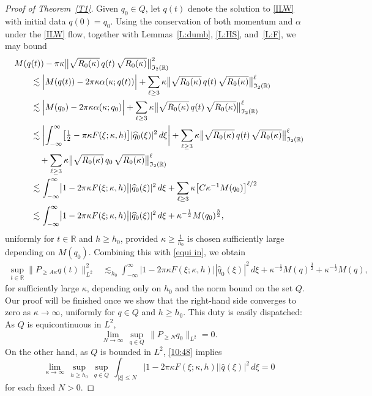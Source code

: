 \documentclass{amsart}
\newcommand{\R}{{\mathbb{R}}}
\theoremstyle{definition}
\theoremstyle{remark}
\begin{document}
\begin{proof}[Proof of Theorem~\ref{T1}]
Given $q_0\in Q$, let $q(t)$ denote the solution to \eqref{ILW} with initial data $q(0)=q_0$.  Using the conservation of both momentum and $\alpha$ under the \eqref{ILW} flow, together with Lemmas~\ref{L:dumb}, \ref{L:HS}, and~\ref{L:F}, we may bound
\begin{align*}
M(q&(t)) - \pi\kappa \bigl\| \sqrt{R_0(\kappa)}\, q(t)\, \sqrt{R_0(\kappa)}\bigr\|_{\mathfrak I_2(\R)}^2 \notag\\
&\lesssim \Bigl| M(q(t)) - 2\pi\kappa \alpha(\kappa;q(t))\Bigr|
	+ \sum_{\ell\geq 3} \kappa \bigl\| \sqrt{R_0(\kappa)}\, q(t)\, \sqrt{R_0(\kappa)}\bigr\|_{\mathfrak I_2(\R)}^\ell \notag\\
&\lesssim \Bigl| M(q_0) - 2\pi\kappa \alpha(\kappa;q_0)\Bigr|
	+ \sum_{\ell\geq 3} \kappa \bigl\| \sqrt{R_0(\kappa)}\, q(t)\, \sqrt{R_0(\kappa)} \bigr\|_{\mathfrak I_2(\R)}^\ell \notag\\
&\lesssim \biggl| \int_{-\infty}^\infty \bigl[\tfrac12-\pi\kappa F(\xi;\kappa,h)\bigr]|\widehat q_0(\xi)|^2\,d\xi \biggr|
	+ \sum_{\ell\geq 3} \kappa\bigl\| \sqrt{R_0(\kappa)}\, q(t)\, \sqrt{R_0(\kappa)}\bigr\|_{\mathfrak I_2(\R)}^\ell \notag\\
&\quad + \sum_{\ell\geq 3} \kappa \bigl\| \sqrt{R_0(\kappa)}\, q_0\, \sqrt{R_0(\kappa)}\bigr\|_{\mathfrak I_2(\R)}^\ell \notag\\
&\lesssim \int_{-\infty}^\infty \bigl|1-2\pi\kappa F(\xi;\kappa,h)\bigr||\widehat q_0(\xi)|^2\,d\xi
	+ \sum_{\ell\geq 3} \kappa \bigl[C\kappa^{-1} M(q_0) \bigr]^{\ell/2}  \notag\\
&\lesssim \int_{-\infty}^\infty \bigl|1-2\pi\kappa F(\xi;\kappa,h)\bigr| |\widehat q_0(\xi)|^2\,d\xi + \kappa^{-\frac12} M(q_0)^{\frac32},
\end{align*}
uniformly for $t\in \R$ and \(h\geq h_0\), provided $\kappa\geq\frac1{h_0}$ is chosen sufficiently large depending on $M(q_0)$.  Combining this with \eqref{equi in}, we obtain
\begin{align*}
\sup_{t\in\R} \|P_{\geq A\kappa} q(t)\|_{L^2}^2 &\lesssim_{h_0} \int_{-\infty}^\infty \bigl|1-2\pi\kappa F(\xi;\kappa,h)\bigr| |\widehat q_0(\xi)|^2\,d\xi
	+ \kappa^{-\frac12} M(q)^{\frac32} + \kappa^{-\frac12} M(q),
\end{align*}
for sufficiently large $\kappa$, depending only on $h_0$ and the norm bound on the set $Q$.  Our proof will be finished once we show that the right-hand side converges to zero as $\kappa\to\infty$, uniformly for $q\in Q$ and \(h\geq h_0\).  This duty is easily dispatched:  As $Q$ is equicontinuous in $L^2$,
$$
\lim_{N\to \infty} \,\sup_{q\in Q}\,\|P_{\geq N}q_0\|_{L^2}=0.
$$
On the other hand, as $Q$ is bounded in $L^2$, \eqref{10:48} implies
$$
\lim_{\kappa\to \infty} \,\sup_{h\geq h_0}\,\sup_{q\in Q}\, \int_{|\xi|\leq N} \bigl| 1-2\pi\kappa F(\xi;\kappa,h)\bigr| |\widehat q(\xi)|^2\,d\xi =0
$$
for each fixed $N>0$.
\end{proof}
\end{document}
